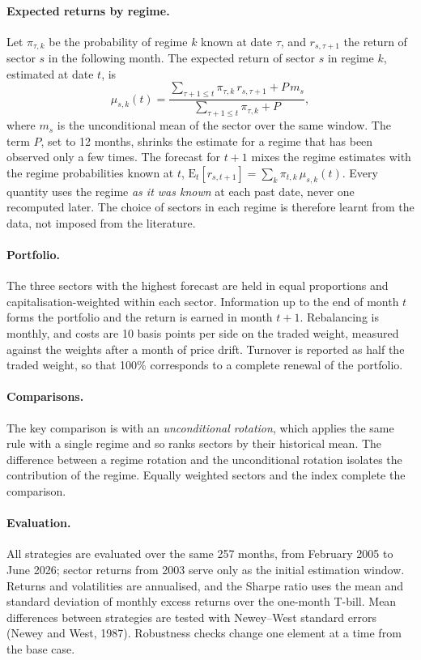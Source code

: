 \documentclass[11pt,a4paper]{article}
\begin{document}
\paragraph{Expected returns by regime.} Let $\pi_{\tau,k}$ be the probability of regime $k$ known at date $\tau$, and $r_{s,\tau+1}$ the return of sector $s$ in the following month. The expected return of sector $s$ in regime $k$, estimated at date $t$, is
\begin{equation}
\mu_{s,k}(t) = \frac{\sum_{\tau+1 \le t} \pi_{\tau,k}\, r_{s,\tau+1} + P\, m_s}{\sum_{\tau+1 \le t} \pi_{\tau,k} + P},
\end{equation}
where $m_s$ is the unconditional mean of the sector over the same window. The term $P$, set to 12 months, shrinks the estimate for a regime that has been observed only a few times. The forecast for $t+1$ mixes the regime estimates with the regime probabilities known at $t$, $\mathrm{E}_t[r_{s,t+1}] = \sum_k \pi_{t,k}\,\mu_{s,k}(t)$. Every quantity uses the regime \emph{as it was known} at each past date, never one recomputed later. The choice of sectors in each regime is therefore learnt from the data, not imposed from the literature.

\paragraph{Portfolio.} The three sectors with the highest forecast are held in equal proportions and capitalisation-weighted within each sector. Information up to the end of month $t$ forms the portfolio and the return is earned in month $t+1$. Rebalancing is monthly, and costs are 10 basis points per side on the traded weight, measured against the weights after a month of price drift. Turnover is reported as half the traded weight, so that 100\% corresponds to a complete renewal of the portfolio.

\paragraph{Comparisons.} The key comparison is with an \emph{unconditional rotation}, which applies the same rule with a single regime and so ranks sectors by their historical mean. The difference between a regime rotation and the unconditional rotation isolates the contribution of the regime. Equally weighted sectors and the index complete the comparison.

\paragraph{Evaluation.} All strategies are evaluated over the same 257 months, from February 2005 to June 2026; sector returns from 2003 serve only as the initial estimation window. Returns and volatilities are annualised, and the Sharpe ratio uses the mean and standard deviation of monthly excess returns over the one-month T-bill. Mean differences between strategies are tested with Newey--West standard errors (Newey and West, 1987). Robustness checks change one element at a time from the base case.
\end{document}
